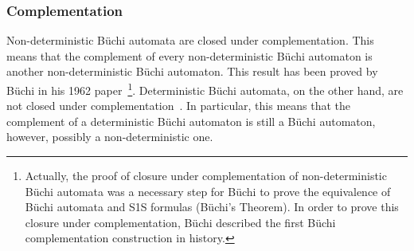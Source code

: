




\subsubsection{Complementation}
Non-deterministic Büchi automata are closed under complementation. This means that the complement of every non-deterministic Büchi automaton is another non-deterministic Büchi automaton. This result has been proved by Büchi in his 1962 paper~\cite{buchi1960decision}\footnote{Actually, the proof of closure under complementation of non-deterministic Büchi automata was a necessary step for Büchi to prove the equivalence of Büchi automata and S1S formulas (Büchi's Theorem). In order to prove this closure under complementation, Büchi described the first Büchi complementation construction in history.}. Deterministic Büchi automata, on the other hand, are not closed under complementation~\cite{Thomas:1991}. In particular, this means that the complement of a deterministic Büchi automaton is still a Büchi automaton, however, possibly a non-deterministic one.

